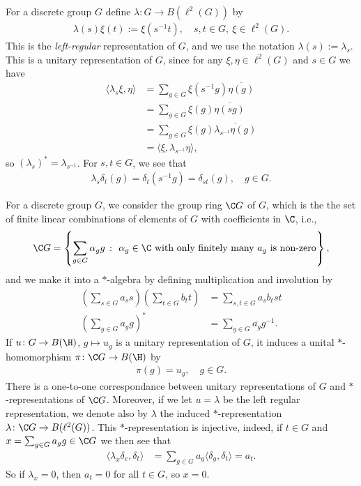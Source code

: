 \begin{definition}
For a discrete group $G$ define $\lambda \colon G \to B(\ell^2(G))$ by
\begin{align*}
\lambda(s) \xi(t):=\xi(s^{-1}t), \quad s,t \in G, \ \xi \in \ell^2(G).
\end{align*}
This is the \emph{left-regular} representation of $G$, and we use the notation $\lambda(s):= \lambda_s$. This is a unitary representation of $G$, since for any $\xi,\eta\in \ell^2(G)$ and $s \in G$ we have 
\begin{align*}
\langle \lambda_s \xi , \eta \rangle &= \sum_{g \in G} \xi(s^{-1} g) \overline{\eta (g)}\\
&= \sum_{g \in G} \xi(g) \overline{\eta(sg)}\\
&= \sum_{g \in G} \xi(g) \overline{\lambda_{s^{-1}}\eta(g)}\\
&=\langle \xi,\lambda_{s^{-1}} \eta \rangle,
\end{align*}
so $(\lambda_s)^* = \lambda_{s^{-1}}$. For $s,t \in G$, we see that 
\begin{align*}
\lambda_{s} \delta_{t}(g) = \delta_{t} (s^{-1} g) = \delta_{st}(g), \quad g \in G.
\end{align*}
\end{definition}

For a discrete group $G$, we consider the group ring $\C G$ of $G$, which is the the set of finite linear combinations of elements of $G$ with coefficients in $\C$, i.e.,
\begin{align*}
\C G= \left \{ \sum_{g \in G} \alpha_g g \ \colon \ \alpha_g \in \C \text{ with only finitely many } a_g \text{ is non-zero} \right \},
\end{align*}
and we make it into a $*$-algebra by defining multiplication and involution by
\begin{align*}
\left( \sum_{s \in G} a_s s \right) \left( \sum_{t \in G} b_t t \right)&= \sum_{s,t \in G} a_s b_t st\\
\left( \sum_{g \in G} a_g g\right)^*&=\sum_{g \in G} \overline{a_g} g^{-1}.
\end{align*} 
If $u \colon G \to B(\H)$, $g \mapsto u_g$ is a unitary representation of $G$, it induces a unital $*$-homomorphism $\pi \colon \C G \to B(\H)$ by
\begin{align*}
\pi(g)= u_g, \quad g \in G.
\end{align*}
There is a one-to-one correspondance between unitary representations of $G$ and $*$-representations of $\C G$. Moreover, if we let $u=\lambda$ be the left regular representation, we denote also by $\lambda$ the induced $*$-representation $\lambda \colon \C G \to B(\ell^2(G))$. This $*$-representation is injective, indeed, if $t \in G$ and $x = \sum_{g \in G} a_g g \in \C G$ we then see that
\begin{align*}
\langle \lambda_x \delta_e,\delta_t\rangle &= \sum_{g \in G} a_g \langle \delta_g , \delta_t \rangle = a_t.
\end{align*}
So if $\lambda_x=0$, then $a_t=0$ for all $t \in G$, so $x=0$.

